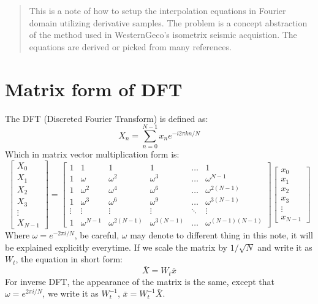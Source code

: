 \documentclass[12pt]{article}
\begin{document}
\maketitle

\begin{abstract}
This is a note of how to setup the interpolation equations in Fourier domain utilizing derivative samples.
The problem is a concept abstraction of the method used in WesternGeco's isometrix seismic acquistion.
The equations are derived or picked from many references.
\end{abstract}

\section{Matrix form of DFT}
The DFT (Discreted Fourier Transform) is defined as:
\begin{equation}
    X_n = \sum_{n=0}^{N-1} x_n e ^ {-i2\pi kn/N}
\end{equation}
Which in matrix vector multiplication form is:
\begin{equation}
\begin{bmatrix}
    X_0 \\ X_1 \\ X_2 \\ X_3 \\ \vdots \\ X_{N-1} 
\end{bmatrix}
=
    \begin{bmatrix}
        1 & 1 & 1 & 1 & \ldots & 1 \\
        1 & \omega & \omega^2 & \omega^3 & \ldots & \omega^{N-1} \\
        1 & \omega^2 & \omega^4 & \omega^6 & \ldots & \omega^{2(N-1)} \\
        1 & \omega^3 & \omega^6 & \omega^9 & \ldots & \omega^{3(N-1)} \\
        \vdots & \vdots & \vdots & \vdots & \ddots & \vdots \\
        1 & \omega^{N-1} & \omega^{2(N-1)} & \omega^{3(N-1)} & \ldots & \omega^{(N-1)(N-1)} 
    \end{bmatrix}
    \begin{bmatrix}
        x_0 \\ x_1 \\ x_2 \\ x_3 \\ \vdots \\ x_{N-1}
    \end{bmatrix}
\end{equation}
Where $\omega=e^{-2\pi i/N}$, be careful, $\omega$ may denote to different thing in this note,
it will be explained explicitly everytime.
If we scale the matrix by $1/\sqrt{N}$ and write it as $W_t$, the equation in short form:
\begin{equation}
    \bar{X} = W_t\bar{x}
\end{equation}
For inverse DFT, the appearance of the matrix is the same, except that $\omega=e^{2\pi i/N}$, 
we write it as $W_t^{-1}$, $\bar{x} = W_t^{-1}\bar{X}$.
\end{document}
